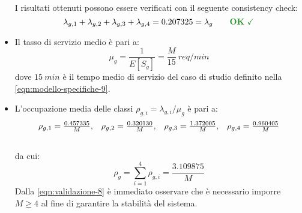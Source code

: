 \begin{itemize}
I risultati ottenuti possono essere verificati con il seguente consistency check:
\begin{equation}
\lambda_{g,1} + \lambda_{g,2} + \lambda_{g,3} + \lambda_{g,4} = 0.207325 = \lambda_g \qquad \text{\color{forestgreen}\textbf{OK} \checkmark} \\
\end{equation}

\item Il tasso di servizio medio è pari a:
\begin{equation}
\label{eqn:validazione-6}
\mu_g = \frac{1}{E[S_g]} = \frac{M}{15}\ req/min
\end{equation}
dove $15\ min$ è il tempo medio di servizio del caso di studio definito nella \ref{eqn:modello-specifiche-9}.

\item L'occupazione media delle classi $\rho_{g,i} = \lambda_{g,i}/\mu_g$ è pari a:
\begin{equation}
\begin{array}{l l l l}
\rho_{g,1} = \frac{0.457335}{M}, & \rho_{g,2} = \frac{0.320130}{M}, & \rho_{g,3} = \frac{1.372005}{M}, & \rho_{g,4} = \frac{0.960405}{M} \\[1.5em]
\end{array}
\end{equation}
da cui:
\begin{equation}
\label{eqn:validazione-8}
\rho_g = \sum_{i=1}^4 \rho_{g,i} = \frac{3.109875}{M}
\end{equation}
Dalla \ref{eqn:validazione-8} è immediato osservare che è necessario imporre $M \geq 4$ al fine di garantire la stabilità del sistema.
\end{itemize}

